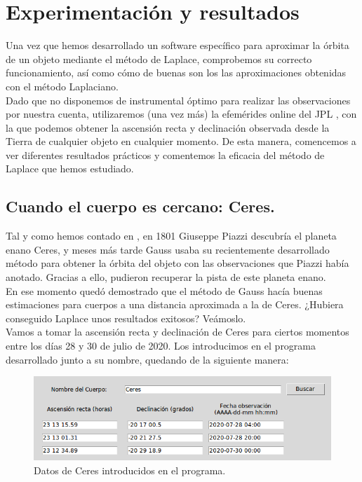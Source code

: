 \documentclass[11pt]{book}
\begin{document}
\newpage
\thispagestyle{empty}


\chapter{Experimentación y resultados}
\label{chap:experimentation}
Una vez que hemos desarrollado un software específico para aproximar la órbita de un objeto mediante el método de Laplace, comprobemos su correcto funcionamiento, así como cómo de buenas son los las aproximaciones obtenidas con el método Laplaciano.\\

Dado que no disponemos de instrumental óptimo para realizar las observaciones por nuestra cuenta, utilizaremos (una vez más) la efemérides online del JPL \cite{jpl}, con la que podemos obtener la ascensión recta y declinación observada desde la Tierra de cualquier objeto en cualquier momento. De esta manera, comencemos a ver diferentes resultados prácticos y comentemos la eficacia del método de Laplace que hemos estudiado.\\

\section{Cuando el cuerpo es cercano: Ceres.}
\label{sec:exp_ceres}
Tal y como hemos contado en \label{sec:history}, en 1801 Giuseppe Piazzi descubría el planeta enano Ceres, y meses más tarde Gauss usaba su recientemente desarrollado método para obtener la órbita del objeto con las observaciones que Piazzi había anotado. Gracias a ello, pudieron recuperar la pista de este planeta enano.\\

En ese momento quedó demostrado que el método de Gauss hacía buenas estimaciones para cuerpos a una distancia aproximada a la de Ceres. ¿Hubiera conseguido Laplace unos resultados exitosos? Veámoslo.\\

Vamos a tomar la ascensión recta y declinación de Ceres para ciertos momentos entre los días 28 y 30 de julio de 2020. Los introducimos en el programa desarrollado junto a su nombre, quedando de la siguiente manera:
\begin{figure}[H]
\centering
\includegraphics[scale=0.5]{images/ceres_exp.png}
\caption{Datos de Ceres introducidos en el programa.}
\label{fig:ceres_exp}
\end{figure}
\end{document}
